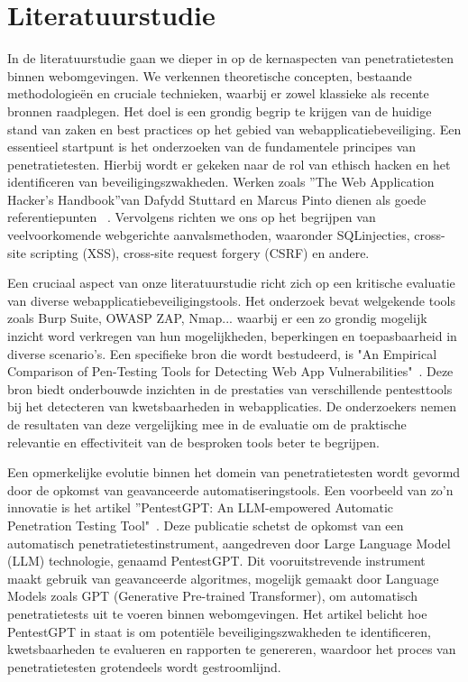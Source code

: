 \section{Literatuurstudie}%
\label{sec:literatuurstudie}

In de literatuurstudie gaan we dieper in op de
kernaspecten van penetratietesten binnen webomgevingen.
We verkennen theoretische concepten,
bestaande methodologieën en cruciale
technieken, waarbij er zowel klassieke als recente
bronnen raadplegen. Het doel is een grondig begrip
te krijgen van de huidige stand van zaken en
best practices op het gebied van webapplicatiebeveiliging.
Een essentieel startpunt is het onderzoeken
van de fundamentele principes van penetratietesten.
Hierbij wordt er gekeken naar de rol van
ethisch hacken en het identificeren van beveiligingszwakheden.
Werken zoals ”The Web Application
Hacker’s Handbook”van Dafydd Stuttard
en Marcus Pinto dienen als goede referentiepunten
~\autocite{Stuttard2011}. Vervolgens richten
we ons op het begrijpen van veelvoorkomende
webgerichte aanvalsmethoden, waaronder SQLinjecties,
cross-site scripting (XSS), cross-site request
forgery (CSRF) en andere.

Een cruciaal aspect van onze literatuurstudie
richt zich op een kritische evaluatie van diverse
webapplicatiebeveiligingstools. Het onderzoek
bevat welgekende tools zoals Burp Suite, OWASP
ZAP, Nmap... waarbij er een zo grondig mogelijk
inzicht word verkregen van hun mogelijkheden,
beperkingen en toepasbaarheid in diverse scenario's. Een specifieke bron die wordt bestudeerd,
is "An Empirical Comparison of Pen-Testing Tools
for Detecting Web App Vulnerabilities"~\autocite{Albahar2022}. Deze bron biedt onderbouwde inzichten
in de prestaties van verschillende pentesttools
bij het detecteren van kwetsbaarheden
in webapplicaties. De onderzoekers nemen de resultaten
van deze vergelijking mee in de evaluatie
om de praktische relevantie en effectiviteit van de
besproken tools beter te begrijpen.

Een opmerkelijke evolutie binnen het domein
van penetratietesten wordt gevormd door de opkomst
van geavanceerde automatiseringstools. Een
voorbeeld van zo'n innovatie is het artikel ”PentestGPT:
An LLM-empowered Automatic Penetration
Testing Tool"~\autocite{Deng2023}. Deze publicatie
schetst de opkomst van een automatisch penetratietestinstrument,
aangedreven door Large
Language Model (LLM) technologie, genaamd PentestGPT.
Dit vooruitstrevende instrument maakt
gebruik van geavanceerde algoritmes, mogelijk
gemaakt door Language Models zoals GPT (Generative
Pre-trained Transformer), om automatisch
penetratietests uit te voeren binnen webomgevingen.
Het artikel belicht hoe PentestGPT in
staat is om potentiële beveiligingszwakheden te
identificeren, kwetsbaarheden te evalueren en rapporten
te genereren, waardoor het proces van penetratietesten
grotendeels wordt gestroomlijnd.

